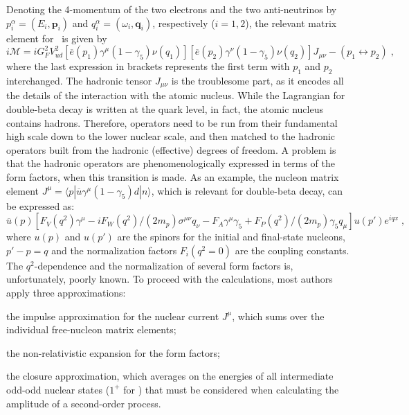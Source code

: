 Denoting the 4-momentum of the two electrons and the two anti-neutrinos by $p^\alpha_i =
(E_i,\mathbf{p}_i)$ and $q^\alpha_i = (\omega_i,\mathbf{q}_i)$, respectively ($i=1,2$),
the relevant matrix element for \nnbb\ is given by
\[
  i\mathcal{M} = iG^2_F V^2_{ud}
                 [\overline{e}(p_1) \gamma^\mu (1-\gamma_5) \nu(q_1)]
                 [\overline{e}(p_2) \gamma^\nu (1-\gamma_5) \nu(q_2)]
                 J_{\mu\nu} - (p_1\leftrightarrow p_2) \;,
\]
where the last expression in brackets represents the first term with $p_1$ and $p_2$
interchanged. The hadronic tensor $J_{\mu\nu}$ is the troublesome part, as it encodes all
the details of the interaction with the atomic nucleus. While the Lagrangian for
double-beta decay is written at the quark level, in fact, the atomic nucleus contains
hadrons. Therefore, operators need to be run from their fundamental high scale down to the
lower nuclear scale, and then matched to the hadronic operators built from the hadronic
(effective) degrees of freedom. A problem is that the hadronic operators are
phenomenologically expressed in terms of the form factors, when this transition is made.
As an example, the nucleon matrix element $J^\mu = \langle{p}| \overline{u} \gamma^\mu
(1-\gamma_5) d |{n}\rangle$, which is relevant for double-beta decay, can be expressed as:
\[
  \overline{u}(p) \left[
    F_V(q^2)\gamma^\mu
    - iF_W(q^2)/(2m_p) \sigma^{\mu\nu} q_\nu
    - F_A\gamma^\mu\gamma_5
    + F_P(q^2)/(2m_p)\gamma_5q_\mu
  \right] u(p')e^{iqx} \;,
\]
where $u(p)$ and $u(p')$ are the spinors for the initial and final-state nucleons, $p'-p=q$
and the normalization factors $F_i(q^2=0)$ are the coupling constants. The
$q^2$-dependence and the normalization of several form factors is, unfortunately, poorly
known.  To proceed with the calculations, most authors apply three approximations:
\begin{inparaenum}[\itshape a)]
  \item the impulse approximation for the nuclear current $J^\mu$, which sums over the
    individual free-nucleon matrix elements;
  \item the non-relativistic expansion for the form factors;
  \item the closure approximation, which averages on the energies of all intermediate
    odd-odd nuclear states ($1^+$ for \nnbb) that must be considered when calculating the
    amplitude of a second-order process. 
\end{inparaenum}
